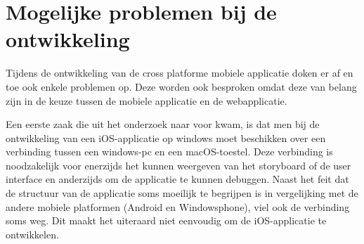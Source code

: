\section{Mogelijke problemen bij de ontwikkeling}
Tijdens de ontwikkeling van de cross platforme mobiele applicatie doken er af en toe ook enkele problemen op.
Deze worden ook besproken omdat deze van belang zijn in de keuze tussen de mobiele applicatie en de webapplicatie.

Een eerste zaak die uit het onderzoek naar voor kwam, is dat men bij de ontwikkeling van een iOS-applicatie op windows moet beschikken
over een verbinding tussen een windows-pc en een macOS-toestel. Deze verbinding is noodzakelijk voor enerzijds het kunnen weergeven van
het storyboard of de user interface en anderzijds om de applicatie te kunnen debuggen. Naast het feit dat de structuur van de applicatie
soms moeilijk te begrijpen is in vergelijking met de andere mobiele platformen (Android en Windowsphone), viel ook de verbinding soms weg.
Dit maakt het uiteraard niet eenvoudig om de iOS-applicatie te ontwikkelen.
